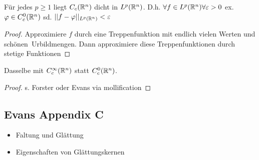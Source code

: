\begin{satz}
	F\"ur jedes $p \geq 1$ liegt $C_c(\mathbb{R}^n)$ dicht in $L^p(\mathbb{R}^n)$.
	D.h. $\forall f \in L^p(\mathbb{R}^n) \forall \varepsilon > 0 $ ex. $\varphi \in C^0_c(\mathbb{R}^n)$ sd. $||f-\varphi||_{ L^p(\mathbb{R}^n)} < \varepsilon$
\end{satz}

\begin{proof}
	Approximiere $f$ durch eine Treppenfunktion mit endlich vielen Werten und \glqq sch\"onen\grqq\ Urbildmengen. Dann approximiere diese Treppenfunktionen durch stetige Funktionen
\end{proof}

\begin{satz}
	Dasselbe mit $C^\infty_c(\mathbb{R}^n)$ statt $C^0_c(\mathbb{R}^n)$.
\end{satz}

\begin{proof}
	s. Forster oder Evans via \glqq mollification\grqq
\end{proof}


\subsection{Evans Appendix C}

\begin{itemize}
	\item Faltung und Gl\"attung
	\item Eigenschaften von Gl\"attungskernen
\end{itemize}
